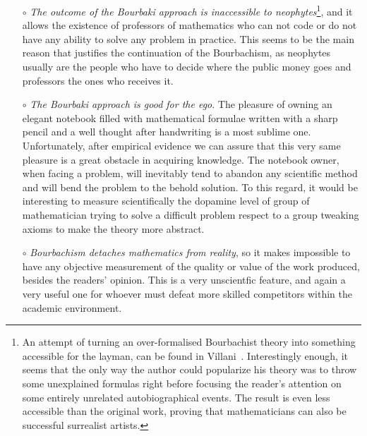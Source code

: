 \documentclass[]{scrartcl}
\theoremstyle{definition}
\begin{document}
\begin{itemize}
    \item[$\circ$] \emph{The outcome of the Bourbaki approach is inaccessible to neophytes}\footnote{
        An attempt of turning an over-formalised Bourbachist theory into something accessible for the layman, can be found in Villani~\cite{villani2003livingtheorem}. Interestingly enough, it seems that the only way the author could popularize his theory was to throw some unexplained formulas right before focusing the reader's attention on some entirely unrelated autobiographical events. The result is even less accessible than the original work, proving that mathematicians can also be successful surrealist artists.
    }, and it allows the existence of professors of mathematics who can not code or do not have any ability to solve any problem in practice. This seems to be the main reason that justifies the continuation of the Bourbachism, as neophytes usually are the people who have to decide where the public money goes and professors the ones who receives it.

    \item[$\circ$] \emph{The Bourbaki approach is good for the ego}. The pleasure of owning an elegant notebook filled with mathematical formulae written with a sharp pencil and a well thought after handwriting is a most sublime one. Unfortunately, after empirical evidence we can assure that this very same pleasure is a great obstacle in acquiring knowledge. The notebook owner, when facing a problem, will inevitably tend to abandon any scientific method and will bend the problem to the behold solution. To this regard, it would be interesting to measure scientifically the dopamine level of group of mathematician trying to solve a difficult problem respect to a group tweaking axioms to make the theory more abstract.

    \item[$\circ$] \emph{Bourbachism detaches mathematics from reality}, so it makes impossible to have any objective measurement of the quality or value of the work produced, besides the readers' opinion. This is a very unscientfic feature, and again a very useful one for whoever must defeat more skilled competitors within the academic environment.


\end{itemize}
\end{document}
